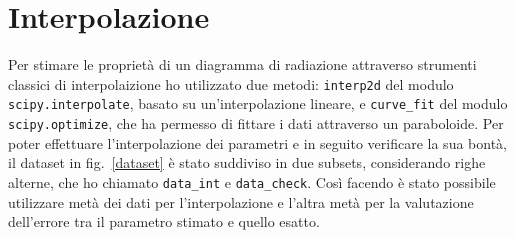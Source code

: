\documentclass[12pt,a4paper,final]{book}
\begin{document}

\section{Interpolazione}\label{interpolazione}
Per stimare le proprietà di un diagramma di radiazione attraverso strumenti classici di interpolaizione ho utilizzato due metodi: \texttt{interp2d} del modulo \texttt{scipy.interpolate}, basato su un'interpolazione lineare, e \texttt{curve\_fit} del modulo \texttt{scipy.optimize}, che ha permesso di fittare i dati attraverso un paraboloide.
Per poter effettuare l'interpolazione dei parametri e in seguito verificare la sua bontà, il dataset in fig.~\ref{dataset} è stato suddiviso in due subsets, considerando righe alterne, che ho chiamato \texttt{data\_int} e \texttt{data\_check}. Così facendo è stato possibile utilizzare metà dei dati per l'interpolazione e l'altra metà per la valutazione dell'errore tra il parametro stimato e quello esatto.

\end{document}
